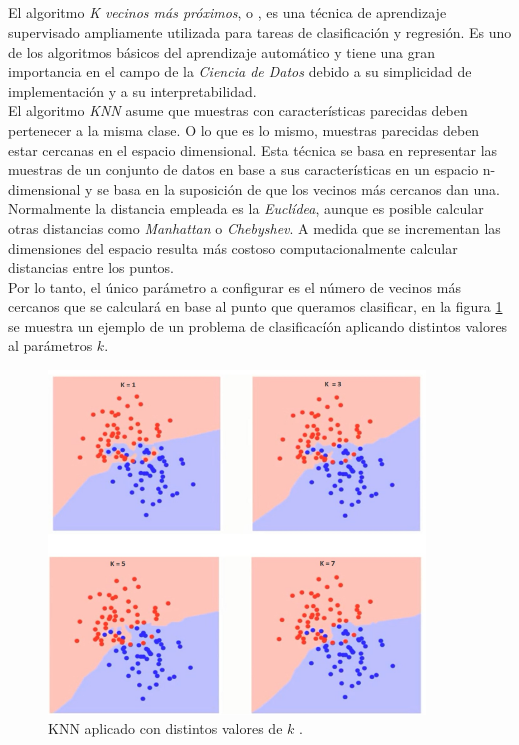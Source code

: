             \subsection {}

                El algoritmo \textit{K vecinos más próximos}, o  \cite{KNN}, es una técnica de aprendizaje supervisado ampliamente utilizada para tareas de clasificación y regresión. Es uno de los algoritmos básicos del aprendizaje automático y tiene una gran importancia en el campo de la \textit{Ciencia de Datos} debido a su simplicidad de implementación y a su interpretabilidad.\\

                El algoritmo \textit{KNN} asume que muestras con características parecidas deben pertenecer a la misma clase. O lo que es lo mismo, muestras parecidas deben estar cercanas en el espacio dimensional. Esta técnica se basa en representar las muestras de un conjunto de datos en base a sus características en un espacio n-dimensional y se basa en la suposición de que los vecinos más cercanos dan una. Normalmente la distancia empleada es la \textit{Euclídea}, aunque es posible calcular otras distancias como \textit{Manhattan} o \textit{Chebyshev}. A medida que se incrementan las dimensiones del espacio resulta más costoso computacionalmente calcular distancias entre los puntos.\\


                Por lo tanto, el único parámetro a configurar es el número de vecinos más cercanos que se calculará en base al punto que queramos clasificar, en la figura \ref{KNNImage} se muestra un ejemplo de un problema de clasificacíón aplicando distintos valores al parámetros $k$.

                \begin{figure}[h]
                    \centering
                    \includegraphics[width=10cm]{archivos/3.Tecnologias/KNN/KNNImage}
                    \captionsetup{width=.75\textwidth}
                    \caption{KNN aplicado con distintos valores de $k$ \cite{ReferenciaKNNImagen}.}
                    \label{KNNImage}
                \end{figure}

